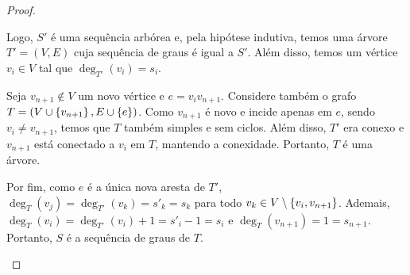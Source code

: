 \begin{proof}
\begin{ncasos}
        Logo, $S'$ é uma sequência arbórea e, pela hipótese indutiva, temos uma árvore $T' = (V, E)$ cuja sequência de graus é igual a $S'$. Além disso, temos um vértice $v_i \in V$ tal que $\deg_{T'}(v_i) = s_i$.

        Seja $v_{n + 1} \not\in V$ um novo vértice e $e = v_i v_{n + 1}$. Considere também o grafo $T = (V \cup \set{v_{n + 1}}, E \cup \set{e})$. Como $v_{n + 1}$ é novo e incide apenas em $e$, sendo $v_i \ne v_{n +1}$, temos que $T$ também simples e sem ciclos. Além disso, $T'$ era conexo e $v_{n + 1}$ está conectado a $v_i$ em $T$, mantendo a conexidade. Portanto, $T$ é uma árvore.

        Por fim, como $e$ é a única nova aresta de $T'$, $\deg_T(v_j) = \deg_{T'}(v_k) = s'_k = s_k$ para todo $v_k \in V \setminus \set{v_i, v_{n +1}}$. Ademais, $\deg_T(v_i) = \deg_{T'}(v_i) + 1 = s'_i - 1 = s_i$ e $\deg_T(v_{n + 1}) = 1 = s_{n + 1}$. Portanto, $S$ é a sequência de graus de $T$.
    \end{ncasos}
\end{proof}
